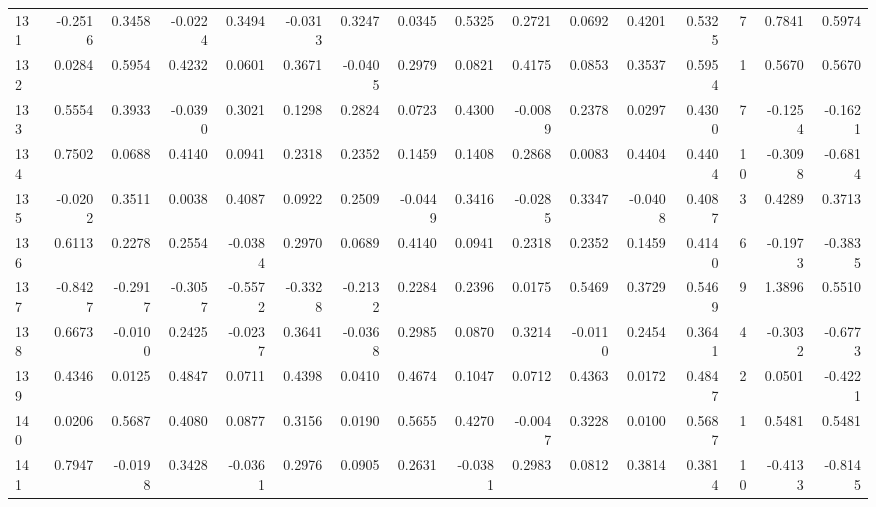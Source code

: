 \begin{tabular}{lrrrrrrrrrrrrrrr}
131 &     -0.2516 &  0.3458 & -0.0224 &  0.3494 & -0.0313 &  0.3247 &  0.0345 &  0.5325 &  0.2721 &  0.0692 &   0.4201 &     0.5325 &      7 &                    0.7841 &                     0.5974 \\
132 &      0.0284 &  0.5954 &  0.4232 &  0.0601 &  0.3671 & -0.0405 &  0.2979 &  0.0821 &  0.4175 &  0.0853 &   0.3537 &     0.5954 &      1 &                    0.5670 &                     0.5670 \\
133 &      0.5554 &  0.3933 & -0.0390 &  0.3021 &  0.1298 &  0.2824 &  0.0723 &  0.4300 & -0.0089 &  0.2378 &   0.0297 &     0.4300 &      7 &                   -0.1254 &                    -0.1621 \\
134 &      0.7502 &  0.0688 &  0.4140 &  0.0941 &  0.2318 &  0.2352 &  0.1459 &  0.1408 &  0.2868 &  0.0083 &   0.4404 &     0.4404 &     10 &                   -0.3098 &                    -0.6814 \\
135 &     -0.0202 &  0.3511 &  0.0038 &  0.4087 &  0.0922 &  0.2509 & -0.0449 &  0.3416 & -0.0285 &  0.3347 &  -0.0408 &     0.4087 &      3 &                    0.4289 &                     0.3713 \\
136 &      0.6113 &  0.2278 &  0.2554 & -0.0384 &  0.2970 &  0.0689 &  0.4140 &  0.0941 &  0.2318 &  0.2352 &   0.1459 &     0.4140 &      6 &                   -0.1973 &                    -0.3835 \\
137 &     -0.8427 & -0.2917 & -0.3057 & -0.5572 & -0.3328 & -0.2132 &  0.2284 &  0.2396 &  0.0175 &  0.5469 &   0.3729 &     0.5469 &      9 &                    1.3896 &                     0.5510 \\
138 &      0.6673 & -0.0100 &  0.2425 & -0.0237 &  0.3641 & -0.0368 &  0.2985 &  0.0870 &  0.3214 & -0.0110 &   0.2454 &     0.3641 &      4 &                   -0.3032 &                    -0.6773 \\
139 &      0.4346 &  0.0125 &  0.4847 &  0.0711 &  0.4398 &  0.0410 &  0.4674 &  0.1047 &  0.0712 &  0.4363 &   0.0172 &     0.4847 &      2 &                    0.0501 &                    -0.4221 \\
140 &      0.0206 &  0.5687 &  0.4080 &  0.0877 &  0.3156 &  0.0190 &  0.5655 &  0.4270 & -0.0047 &  0.3228 &   0.0100 &     0.5687 &      1 &                    0.5481 &                     0.5481 \\
141 &      0.7947 & -0.0198 &  0.3428 & -0.0361 &  0.2976 &  0.0905 &  0.2631 & -0.0381 &  0.2983 &  0.0812 &   0.3814 &     0.3814 &     10 &                   -0.4133 &                    -0.8145 \\

\end{tabular}
